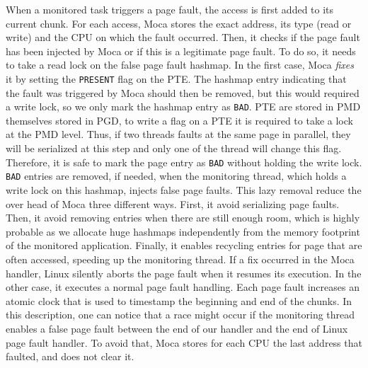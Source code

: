 When a monitored task triggers a page fault, the access is first added to its current chunk.
For each access, \gls{Moca} stores the exact address, its type (read or write) and the CPU on which the fault occurred.
Then, it checks if the page fault has been injected by \gls{Moca} or if this is a legitimate page fault.
To do so, it needs to take a read lock on the false page fault hashmap.
In the first case, \gls{Moca} \emph{fixes} it by setting the \texttt{PRESENT} flag on the \gls{PTE}.
The hashmap entry indicating that the fault was triggered by \gls{Moca} should then be removed, but this would required a write lock, so we only mark the hashmap entry as \texttt{BAD}.
\gls{PTE} are stored in \gls{PMD} themselves stored in \gls{PGD}, to write a flag on a \gls{PTE} it is required to take a lock at the \gls{PMD} level.
Thus, if two threads faults at the same page in parallel, they will be serialized at this step and only one of the thread will change this flag.
Therefore, it is safe to mark the page entry as \texttt{BAD} without holding the write lock.
\texttt{BAD} entries are removed, if needed, when the monitoring thread, which holds a write lock on this hashmap, injects false page faults.
This lazy removal reduce the over head of \gls{Moca} three different ways.
First, it avoid serializing page faults.
Then, it avoid removing entries when there are still enough room, which is highly probable as we allocate huge hashmaps independently from the memory footprint of the monitored application.
Finally, it enables recycling entries for page that are often accessed, speeding up the monitoring thread.
If a fix occurred in the \gls{Moca} handler, Linux silently aborts the page fault when it resumes its execution.
In the other case, it executes a normal page fault handling.
Each page fault increases an atomic clock that is used to timestamp the beginning and end of the chunks.
In this description, one can notice that a race might occur if the monitoring thread enables a false page fault between the end of our handler and the end of Linux page fault handler.
To avoid that, \gls{Moca} stores for each CPU the last address that faulted, and does not clear it.


